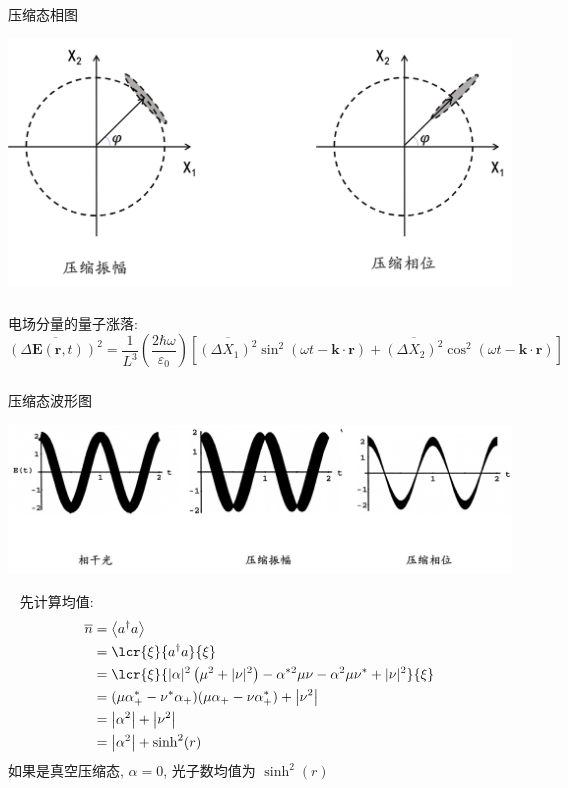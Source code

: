 \begin{frame}
    \frametitle{}
    压缩态相图
      \begin{center}
           \includegraphics[width=1.0\textwidth]{figs/9.png}
      \end{center}   
   \end{frame}

\begin{frame}
 \frametitle{}
      电场分量的量子涨落:
      \[ \overline{ (\Delta \mathbf{E}(\mathbf{r},t))^2} = \frac{1}{L^3} (\frac{2\hbar \omega}{\varepsilon_0}) [ \overline{ (\Delta X_1)^2} \sin ^2 (\omega t - \mathbf{k}\cdot \mathbf{r}) + \overline{ (\Delta X_2)^2} \cos ^2 (\omega t - \mathbf{k}\cdot \mathbf{r}) ]\]
\end{frame}

   \begin{frame}
    \frametitle{}
    压缩态波形图
      \begin{center}
           \includegraphics[width=1.0\textwidth]{figs/12.png}
      \end{center}   
   \end{frame}

\begin{frame}
    \例 [7.  求压缩态光子数的均值和涨落]{
    }
     \解~ 先计算均值: 
      \[ \begin{aligned}
        \overline{n} & = \left\langle a^{\dagger} a\right\rangle  \\ 
        &= \lcr{\xi} {a^{\dagger} a} {\xi} \\ 
        &= \lcr{\xi} {|\alpha|^{2}\left(\mu^{2}+|\nu|^{2}\right)-\alpha^{* 2} \mu \nu-\alpha^{2} \mu \nu^{*}+|\nu|^{2}} {\xi} \\ 
        &= (\mu \alpha^* _{+} - \nu^* \alpha _{+})(\mu \alpha _{+} - \nu \alpha ^* _{+}) + \left| \nu ^2 \right| \\ 
        &= \left|\alpha^2\right| + \left| \nu ^2 \right| \\ 
        &= \left|\alpha^2\right| + \sinh ^2 (r)
       \end{aligned}\]  
       如果是真空压缩态, $\alpha=0 $, 光子数均值为 $\sinh ^2 (r)$  
   \end{frame}

